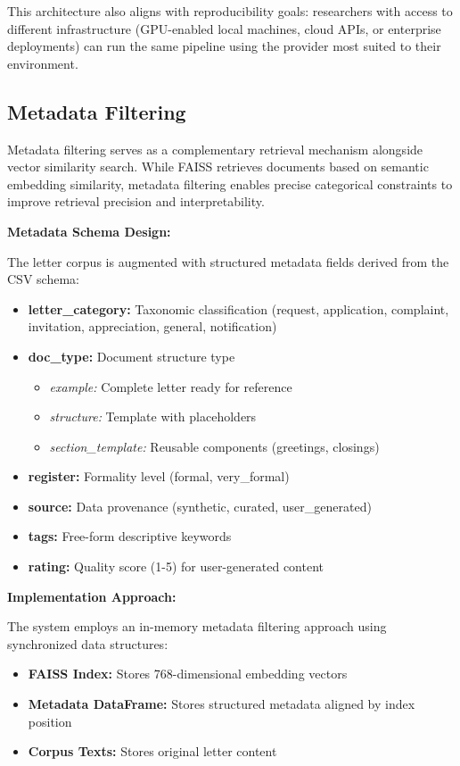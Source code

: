 \documentclass[12pt]{uomthesis}
\begin{document}
This architecture also aligns with reproducibility goals: researchers with access to different infrastructure (GPU-enabled local machines, cloud APIs, or enterprise deployments) can run the same pipeline using the provider most suited to their environment.

\subsection{Metadata Filtering}

Metadata filtering serves as a complementary retrieval mechanism alongside vector similarity search. While FAISS retrieves documents based on semantic embedding similarity, metadata filtering enables precise categorical constraints to improve retrieval precision and interpretability.

\textbf{Metadata Schema Design:}

The letter corpus is augmented with structured metadata fields derived from the CSV schema:

\begin{itemize}
    \item \textbf{letter\_category:} Taxonomic classification (request, application, complaint, invitation, appreciation, general, notification)
    \item \textbf{doc\_type:} Document structure type
    \begin{itemize}
        \item \textit{example:} Complete letter ready for reference
        \item \textit{structure:} Template with placeholders
        \item \textit{section\_template:} Reusable components (greetings, closings)
    \end{itemize}
    \item \textbf{register:} Formality level (formal, very\_formal)
    \item \textbf{source:} Data provenance (synthetic, curated, user\_generated)
    \item \textbf{tags:} Free-form descriptive keywords
    \item \textbf{rating:} Quality score (1-5) for user-generated content
\end{itemize}

\textbf{Implementation Approach:}

The system employs an in-memory metadata filtering approach using synchronized data structures:

\begin{itemize}
    \item \textbf{FAISS Index:} Stores 768-dimensional embedding vectors
    \item \textbf{Metadata DataFrame:} Stores structured metadata aligned by index position
    \item \textbf{Corpus Texts:} Stores original letter content
\end{itemize}
\end{document}
